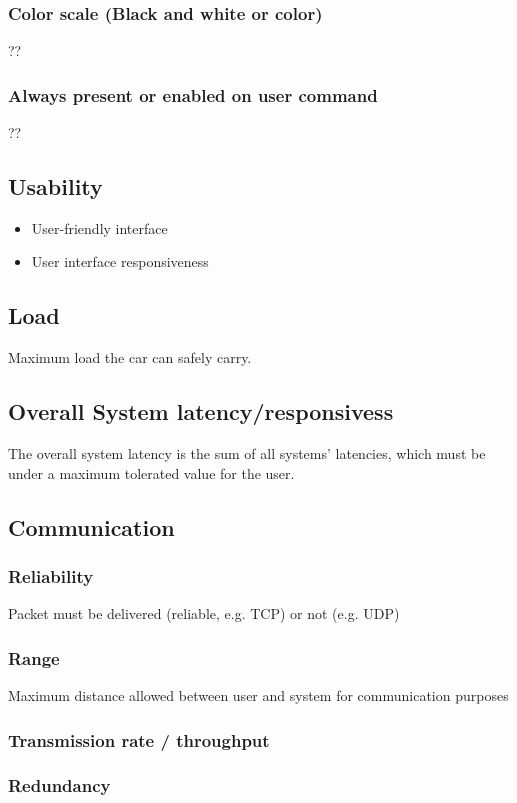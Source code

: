 \subsubsection{Color scale (Black and white or color)}%
\label{sec:org468ee04}
??
\subsubsection{Always present or enabled on user command}%
\label{sec:orgd585352}
??
\subsection{Usability}%
\label{sec:org61632e0}
\begin{itemize}
\item User-friendly interface
\item User interface responsiveness
\end{itemize}
\subsection{Load}%
\label{sec:orgca6a690}
Maximum load the car can safely carry.
\subsection{Overall System latency/responsivess}%
\label{sec:org7fd1829}
The overall system latency is the sum of all systems' latencies, which must be
under a maximum tolerated value for the user.
\subsection{Communication}%
\label{sec:org4241610}
\subsubsection{Reliability}%
\label{sec:orgdcb920d}
Packet must be delivered (reliable, e.g. TCP) or not (e.g. UDP)
\subsubsection{Range}%
\label{sec:org447a205}
Maximum distance allowed between user and system for communication purposes
\subsubsection{Transmission rate / throughput}%
\label{sec:org10e75a5}
\subsubsection{Redundancy}%
\label{sec:orgc5933fc}

